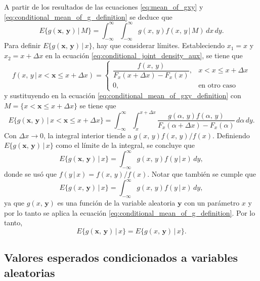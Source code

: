 \documentclass[a4paper]{report}
\newcommand{\x}{\mathbf{x}}
\newcommand{\y}{\mathbf{y}}
\begin{document}
A partir de los resultados de las ecuaciones \ref{eq:mean_of_gxy} y \ref{eq:conditional_mean_of_g_definition} se deduce que
\begin{equation}\label{eq:conditional_mean_of_gxy_definition}
 E\{g(\x,\,\y)\,|\,M\}=\int_{-\infty}^{\infty}\int_{-\infty}^{\infty}g(x,\,y)f(x,\,y\,|\,M)\,dx\,dy.
\end{equation}
Para definir \(E\{g(\x,\,\y)\,|\,x\}\), hay que considerar límites. Estableciendo \(x_1=x\) y \(x_2=x+\Delta x\) en la ecuación \ref{eq:conditional_joint_density_aux}, se tiene que
\[
 f(x,\,y\,|\,x<\x\leq x+\Delta x)
 =\left\{\begin{array}{ll}
   \dfrac{f(x,\,y)}{F_x(x+\Delta x)-F_x(x)}, & x<x\leq x+\Delta x\\ 
   0, & \textrm{en otro caso}
 \end{array} \right.
\]
y sustituyendo en la ecuación \ref{eq:conditional_mean_of_gxy_definition} con \(M=\{x<\x\leq x+\Delta x\}\) se tiene que
\[
 E\{g(\x,\,\y)\,|\,x<\x\leq x+\Delta x\}=\int_{-\infty}^{\infty}\int_{x}^{x+\Delta x}\frac{g(\alpha,\,y)f(\alpha,\,y)}{F_x(\alpha+\Delta x)-F_x(\alpha)}\,d\alpha\,dy.
\]
Con \(\Delta x\to 0\), la integral interior tiende a \(g(x,\,y)f(x,\,y)/f(x)\). Definiendo \\ \(E\{g(\x,\,\y)\,|\,x\}\) como el límite de la integral, se concluye que
\[
  E\{g(\x,\,\y)\,|\,x\}=\int_{-\infty}^{\infty}g(x,\,y)f(y\,|\,x)\,dy,
\]
donde se usó que \(f(y\,|\,x)=f(x,\,y)/f(x)\). Notar que también se cumple que
\[
 E\{g(x,\,\y)\,|\,x\}=\int_{-\infty}^{\infty}g(x,\,y)f(y\,|\,x)\,dy,
\]
ya que \(g(x,\,\y)\) es una función de la variable aleatoria \(\y\) con un parámetro \(x\) y por lo tanto se aplica la ecuación \ref{eq:conditional_mean_of_g_definition}. Por lo tanto,
\[
 E\{g(\x,\,\y)\,|\,x\}=E\{g(x,\,\y)\,|\,x\}.
\]

\subsection{Valores esperados condicionados a variables aleatorias}\label{sec:conditional_expected_values_as_rv}
\end{document}
